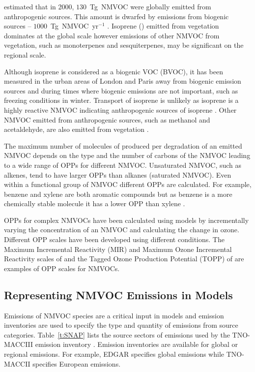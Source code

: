 \citet{Lamarque:2010} estimated that in 2000, $130$~Tg~NMVOC were globally emitted from anthropogenic sources.
This amount is dwarfed by emissions from biogenic sources -- $1000$~Tg~NMVOC~yr$^{-1}$ \citep{Guenther:2012}.
Isoprene () emitted from vegetation dominates at the global scale however emissions of other NMVOC from vegetation, such as monoterpenes and sesquiterpenes, may be significant on the regional scale.

Although isoprene is considered as a biogenic VOC (BVOC), it has been measured in the urban areas of London and Paris away from biogenic emission sources and during times where biogenic emissions are not important, such as freezing conditions in winter.
Transport of isoprene is unlikely as isoprene is a highly reactive NMVOC indicating anthropogenic sources of isoprene \citep{vonSchneidemesser:2011}.
Other NMVOC emitted from anthropogenic sources, such as methanol and acetaldehyde, are also emitted from vegetation \citep{Guenther:2012}.

The maximum number of molecules of  produced per degradation of an emitted NMVOC depends on the type and the number of carbons of the NMVOC leading to a wide range of OPPs for different NMVOC.
Unsaturated NMVOC, such as alkenes, tend to have larger OPPs than alkanes (saturated NMVOC).
Even within a functional group of NMVOC different OPPs are calculated.
For example, benzene and xylene are both aromatic compounds but as benzene is a more chemically stable molecule it has a lower OPP than xylene \citep{Carter:1994}.

OPPs for complex NMVOCs have been calculated using models by incrementally varying the concentration of an NMVOC and calculating the change in ozone.
Different OPP scales have been developed using different  conditions.
The Maximum Incremental Reactivity (MIR) and Maximum Ozone Incremental Reactivity scales of \citet{Carter:1994} and the Tagged Ozone Production Potential (TOPP) of \citet{Butler:2011} are examples of OPP scales for NMVOCs.

\vspace{-6mm}
\subsection{Representing NMVOC Emissions in Models}
\vspace{-2mm}
Emissions of NMVOC species are a critical input in models and emission inventories are used to specify the type and quantity of emissions from source categories.
Table~\ref{t:SNAP} lists the source sectors of emissions used by the TNO-MACCIII emission inventory \citep{Kuenen:2014}.
Emission inventories are available for global or regional emissions.
For example, EDGAR \citep{Olivier:2001} specifies global emissions while TNO-MACCII \citep{Kuenen:2014} specifies European emissions.

